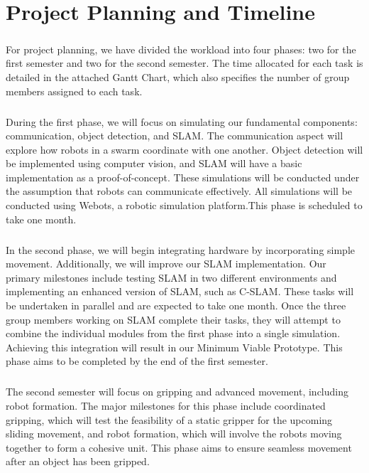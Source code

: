 \chapter{Project Planning and Timeline}

\paragraph*{}
For project planning, we have divided the workload into four phases: two for the first semester and two for the second semester. The time allocated for each task is detailed in the attached Gantt Chart, which also specifies the number of group members assigned to each task.

\paragraph*{}
During the first phase, we will focus on simulating our fundamental components: communication, object detection, and SLAM. The communication aspect will explore how robots in a swarm coordinate with one another. Object detection will be implemented using computer vision, and SLAM will have a basic implementation as a proof-of-concept. These simulations will be conducted under the assumption that robots can communicate effectively. All simulations will be conducted using Webots, a robotic simulation platform.This phase is scheduled to take one month.

\paragraph*{}
In the second phase, we will begin integrating hardware by incorporating simple movement. Additionally, we will improve our SLAM implementation. Our primary milestones include testing SLAM in two different environments and implementing an enhanced version of SLAM, such as C-SLAM. These tasks will be undertaken in parallel and are expected to take one month. Once the three group members working on SLAM complete their tasks, they will attempt to combine the individual modules from the first phase into a single simulation. Achieving this integration will result in our Minimum Viable Prototype. This phase aims to be completed by the end of the first semester.

\paragraph*{}
The second semester will focus on gripping and advanced movement, including robot formation. The major milestones for this phase include coordinated gripping, which will test the feasibility of a static gripper for the upcoming sliding movement, and robot formation, which will involve the robots moving together to form a cohesive unit. This phase aims to ensure seamless movement after an object has been gripped.

